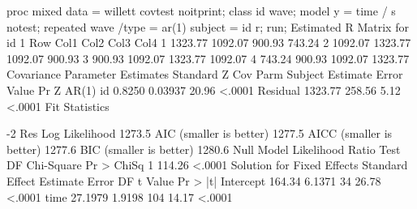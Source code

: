proc mixed data = willett covtest noitprint;
  class id wave;
  model y = time / s notest;
  repeated wave /type = ar(1) subject = id r;
run;
             Estimated R Matrix for id 1
 Row        Col1        Col2        Col3        Col4
   1     1323.77     1092.07      900.93      743.24
   2     1092.07     1323.77     1092.07      900.93
   3      900.93     1092.07     1323.77     1092.07
   4      743.24      900.93     1092.07     1323.77
                  Covariance Parameter Estimates
                                    Standard         Z
Cov Parm     Subject    Estimate       Error     Value        Pr Z
AR(1)        id           0.8250     0.03937     20.96      <.0001
Residual                 1323.77      258.56      5.12      <.0001
           Fit Statistics

-2 Res Log Likelihood          1273.5
AIC (smaller is better)        1277.5
AICC (smaller is better)       1277.6
BIC (smaller is better)        1280.6
  Null Model Likelihood Ratio Test
    DF    Chi-Square      Pr > ChiSq
     1        114.26          <.0001
                   Solution for Fixed Effects
                         Standard
Effect       Estimate       Error      DF    t Value    Pr > |t|
Intercept      164.34      6.1371      34      26.78      <.0001
time          27.1979      1.9198     104      14.17      <.0001
